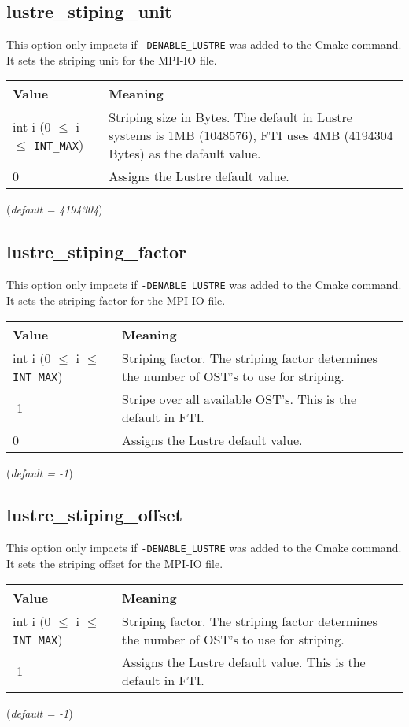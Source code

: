 \documentclass{refrep}
\begin{document}
\subsection{lustre\_stiping\_unit}\label{subsec:localtest}
This option only impacts if {\tt -DENABLE\_LUSTRE} was added to the Cmake command. It sets the striping unit for the MPI-IO file.
\begin{center}
\begin{tabular}[h!]{|p{}|p{}|}
\hline
\textbf{Value} & \textbf{Meaning} \\ \hline
    int i (0 $\leq$ i $\leq$ {\tt INT\_MAX}) & Striping size in Bytes. The default in Lustre systems is 1MB (1048576), FTI uses 4MB (4194304 Bytes) as the dafault value. \\ \hline
    0 & Assigns the Lustre default value. \\ \hline
\end{tabular}
\end{center}
(\textit{default = 4194304})
\subsection{lustre\_stiping\_factor}\label{subsec:localtest}
This option only impacts if {\tt -DENABLE\_LUSTRE} was added to the Cmake command. It sets the striping factor for the MPI-IO file.
\begin{center}
\begin{tabular}[h!]{|p{}|p{}|}
\hline
\textbf{Value} & \textbf{Meaning} \\ \hline
    int i (0 $\leq$ i $\leq$ {\tt INT\_MAX}) & Striping factor. The striping factor determines the number of OST's to use for striping. \\ \hline
    -1 & Stripe over all available OST's. This is the default in FTI. \\ \hline
    0 & Assigns the Lustre default value. \\ \hline
\end{tabular}
\end{center}
(\textit{default = -1})
\subsection{lustre\_stiping\_offset}\label{subsec:localtest}
This option only impacts if {\tt -DENABLE\_LUSTRE} was added to the Cmake command. It sets the striping offset for the MPI-IO file.
\begin{center}
\begin{tabular}[h!]{|p{}|p{}|}
\hline
\textbf{Value} & \textbf{Meaning} \\ \hline
    int i (0 $\leq$ i $\leq$ {\tt INT\_MAX}) & Striping factor. The striping factor determines the number of OST's to use for striping. \\ \hline
    -1 & Assigns the Lustre default value. This is the default in FTI. \\ \hline
\end{tabular}
\end{center}
(\textit{default = -1})
\end{document}
